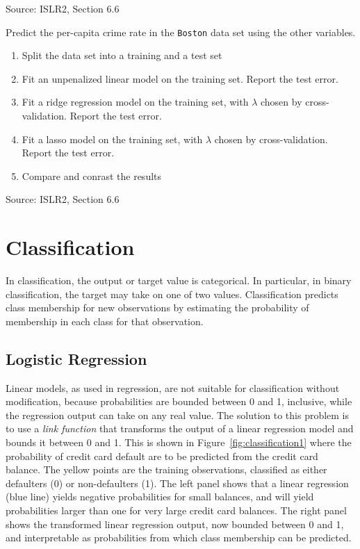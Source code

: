 \begin{withcode}
\begin{exerciseboxcomputer}
\footnotesize Source: ISLR2, Section 6.6 \normalsize
\end{exerciseboxcomputer}


\begin{exerciseboxcomputer}

Predict the per-capita crime rate in the \texttt{Boston} data set using the other variables.
  \begin{enumerate}
      \item Split the data set into a training and a test set
      \item Fit an unpenalized linear model on the training set. Report the test error.
      \item Fit a ridge regression model on the training set, with $\lambda$ chosen by cross-validation. Report the test error.
      \item Fit a lasso model on the training set, with $\lambda$ chosen by cross-validation. Report the test error.
      \item Compare and conrast the results
  \end{enumerate}

\footnotesize Source: ISLR2, Section 6.6 \normalsize
\end{exerciseboxcomputer}
\end{withcode}

\section{Classification}

In classification, the output or target value is categorical. In particular, in binary classification, the target may take on one of two values. Classification predicts class membership for new observations by estimating the probability of membership in each class for that observation. 

\subsection{Logistic Regression}

Linear models, as used in regression, are not suitable for classification without modification, because probabilities are bounded between 0 and 1, inclusive, while the regression output can take on any real value. The solution to this problem is to use a \emph{link function} that transforms the output of a linear regression model and bounds it between 0 and 1. This is shown in Figure~\ref{fig:classification1} where the probability of credit card default are to be predicted from the credit card balance. The yellow points are the training observations, classified as either defaulters (0) or non-defaulters (1). The left panel shows that a linear regression (blue line) yields negative probabilities for small balances, and will yield probabilities larger than one for very large credit card balances. The right panel shows the transformed linear regression output, now bounded between 0 and 1, and interpretable as probabilities from which class membership can be predicted.

